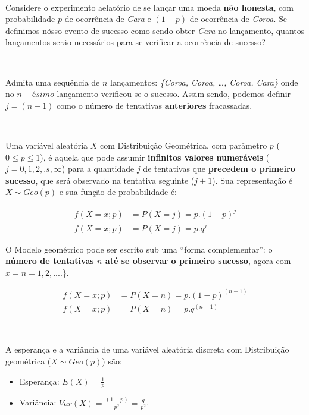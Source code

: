 \documentclass[
]{book}
\providecommand{\tightlist}{%
  \setlength{\itemsep}{0pt}\setlength{\parskip}{0pt}}
\begin{document}
~

Considere o experimento aelatório de se lançar uma moeda \textbf{não honesta}, com probabilidade \(p\) de ocorrência de \emph{Cara} e \((1-p)\) de ocorrência de \emph{Coroa}. Se definimos nõsso evento de sucesso como sendo obter \emph{Cara} no lançamento, quantos lançamentos serão necessários para se verificar a ocorrência de sucesso?

~

Admita uma sequência de \(n\) lançamentos: \emph{\{Coroa, Coroa, \ldots, Coroa, Cara\}} onde no \(n-ésimo\) lançamento verificou-se o sucesso. Assim sendo, podemos definir \(j=(n-1)\) como o número de tentativas \textbf{anteriores} fracassadas.

~

Uma variável aleatória \(X\) com Distribuição Geométrica, com parâmetro \(p\) (\(0 \leq p \leq1\)), é aquela que pode assumir \textbf{infinitos valores numeráveis} (\(j=0,1,2, .s, \infty\)) para a quantidade \(j\) de tentativas que \textbf{precedem o primeiro sucesso}, que será observado na tentativa seguinte (\(j+1\)). Sua representação é \(X\sim Geo(p)\) e sua função de probabilidade é:

\hfill\break

\begin{align*}
f(X=x; p) & = P(X=j) = p . (1-p)^{j} \\
f(X=x; p) & = P(X=j) = p . q^{j}
\end{align*}

\hfill\break

O Modelo geométrico pode ser escrito sub uma ``forma complementar'': o \textbf{número de tentativas \(n\) até se observar o primeiro sucesso}, agora com \(x=n=1, 2, ...\).\}.

\hfill\break

\begin{align*}
f(X=x; p) & = P(X=n) = p . (1-p)^{(n-1)} \\
f(X=x; p) & = P(X=n) = p . q^{(n-1)}  
\end{align*}

~

A esperança e a variância de uma variável aleatória discreta com Distribuição geométrica (\(X\sim Geo(p)\)) são:

\hfill\break

\begin{itemize}
\tightlist
\item
  Esperança: \(E(X) = \frac{1}{p}\)\\
\item
  Variância: \(Var(X) = \frac{(1-p)}{p^{2}} = \frac{q}{p^{2}}\).
\end{itemize}
\end{document}
